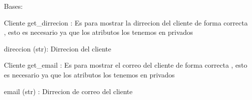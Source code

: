 \documentclass[letterpaper,10pt,spanish]{sphinxmanual}
\begin{document}
\begin{fulllineitems}
\label{\detokenize{proyect:proyect.Clientes.Cliente}}
\pysigstartsignatures
{}
\pysigstopsignatures
\sphinxAtStartPar
Bases: 

\begin{fulllineitems}
\label{\detokenize{proyect:proyect.Clientes.Cliente.get_direccion}}
\pysigstartsignatures
{}
\pysigstopsignatures
\sphinxAtStartPar
Cliente get\_dirrecion : Es para mostrar la dirrecion del cliente de forma correcta , esto es necesario ya que los atributos los tenemos en privados
\begin{description}
\sphinxAtStartPar
direccion (str): Dirrecion del cliente

\end{description}

\end{fulllineitems}


\begin{fulllineitems}
\label{\detokenize{proyect:proyect.Clientes.Cliente.get_email}}
\pysigstartsignatures
{}
\pysigstopsignatures
\sphinxAtStartPar
Cliente get\_email : Es para mostrar el correo del cliente de forma correcta , esto es necesario ya que los atributos los tenemos en privados
\begin{description}
\sphinxAtStartPar
email (str) : Dirrecion de correo del cliente

\end{description}


\end{fulllineitems}
\end{fulllineitems}
\end{document}
